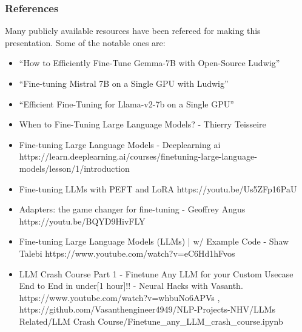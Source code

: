 \begin{frame}\frametitle{References}
Many publicly available resources have been refereed for making this presentation. Some of the notable ones are:
\footnotesize
\begin{itemize}
\item ``How to Efficiently Fine-Tune Gemma-7B with Open-Source Ludwig''
\item ``Fine-tuning Mistral 7B on a Single GPU with Ludwig''
\item ``Efficient Fine-Tuning for Llama-v2-7b on a Single GPU''
\item When to Fine-Tuning Large Language Models? - Thierry Teisseire
\item Fine-tuning Large Language Models - Deeplearning ai https://learn.deeplearning.ai/courses/finetuning-large-language-models/lesson/1/introduction
\item Fine-tuning LLMs with PEFT and LoRA https://youtu.be/Us5ZFp16PaU
\item Adapters: the game changer for fine-tuning - Geoffrey Angus https://youtu.be/BQYD9HivFLY
\item Fine-tuning Large Language Models (LLMs) | w/ Example Code - Shaw Talebi https://www.youtube.com/watch?v=eC6Hd1hFvos
\item LLM Crash Course Part 1 - Finetune Any LLM for your Custom Usecase End to End in under[1 hour]!! - Neural Hacks with Vasanth. https://www.youtube.com/watch?v=whbuNo6APVs  ,  https://github.com/Vasanthengineer4949/NLP-Projects-NHV/LLMs Related/LLM Crash Course/Finetune\_any\_LLM\_crash\_course.ipynb
\end{itemize}

\end{frame}